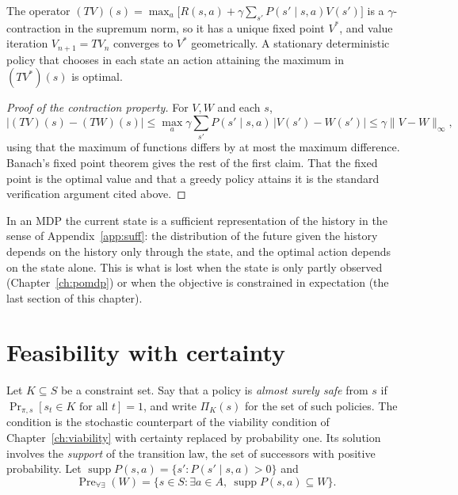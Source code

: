 \begin{established}\label{thm:bellman}
The operator $(TV)(s)=\max_{a}\bigl[R(s,a)+\gamma\sum_{s'}P(s'\mid s,a)V(s')\bigr]$ is a $\gamma$-contraction in the supremum norm, so it has a unique fixed point $V^{*}$, and value iteration $V_{n+1}=TV_n$ converges to $V^{*}$ geometrically. A stationary deterministic policy that chooses in each state an action attaining the maximum in $(TV^{*})(s)$ is optimal.
\end{established}
\begin{proof}[Proof of the contraction property]
For $V,W$ and each $s$,
\[
|(TV)(s)-(TW)(s)|\le\max_a\gamma\sum_{s'}P(s'\mid s,a)\,|V(s')-W(s')|\le\gamma\|V-W\|_\infty,
\]
using that the maximum of functions differs by at most the maximum difference. Banach's fixed point theorem gives the rest of the first claim. That the fixed point is the optimal value and that a greedy policy attains it is the standard verification argument cited above.
\end{proof}

In an MDP the current state is a sufficient representation of the history in the sense of Appendix~\ref{app:suff}: the distribution of the future given the history depends on the history only through the state, and the optimal action depends on the state alone. This is what is lost when the state is only partly observed (Chapter~\ref{ch:pomdp}) or when the objective is constrained in expectation (the last section of this chapter).

\section{Feasibility with certainty}

Let $K\subseteq S$ be a constraint set. Say that a policy is \emph{almost surely safe} from $s$ if $\Pr_{\pi,s}[s_t\in K\text{ for all }t]=1$, and write $\Pi_K(s)$ for the set of such policies. The condition is the stochastic counterpart of the viability condition of Chapter~\ref{ch:viability} with certainty replaced by probability one. Its solution involves the \emph{support} of the transition law, the set of successors with positive probability. Let $\operatorname{supp}P(s,a)=\{s':P(s'\mid s,a)>0\}$ and
\[
\operatorname{Pre}_{\forall\exists}(W)=\{s\in S:\exists a\in A,\ \operatorname{supp}P(s,a)\subseteq W\}.
\]

